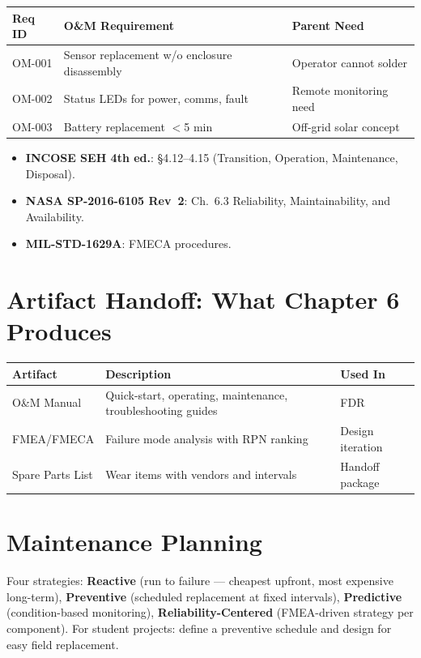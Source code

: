 \documentclass[11pt,letterpaper,twoside,openany]{book}
\begin{document}
\begin{greenshieldbox}
\small
\begin{tabularx}{\textwidth}{l X l}
\toprule
\textbf{Req ID} & \textbf{O\&M Requirement} & \textbf{Parent Need} \\
\midrule
OM-001 & Sensor replacement w/o enclosure disassembly & Operator cannot solder \\
OM-002 & Status LEDs for power, comms, fault & Remote monitoring need \\
OM-003 & Battery replacement $<$5 min & Off-grid solar concept \\
\bottomrule
\end{tabularx}
\end{greenshieldbox}

\begin{keyconceptbox}
\begin{itemize}[nosep,leftmargin=1.5em]
\item \textbf{INCOSE SEH 4th ed.}: \S4.12--4.15 (Transition, Operation, Maintenance, Disposal).
\item \textbf{NASA SP-2016-6105 Rev~2}: Ch.~6.3 Reliability, Maintainability, and Availability.
\item \textbf{MIL-STD-1629A}: FMECA procedures.
\end{itemize}
\end{keyconceptbox}

\section{Artifact Handoff: What Chapter 6 Produces}
\begin{table}[htbp]\centering\small
\begin{tabularx}{\textwidth}{l X l}
\toprule
\textbf{Artifact} & \textbf{Description} & \textbf{Used In} \\
\midrule
O\&M Manual & Quick-start, operating, maintenance, troubleshooting guides & FDR \\
FMEA/FMECA & Failure mode analysis with RPN ranking & Design iteration \\
Spare Parts List & Wear items with vendors and intervals & Handoff package \\
\bottomrule
\end{tabularx}
\end{table}

\section{Maintenance Planning}
Four strategies: \textbf{Reactive} (run to failure — cheapest upfront, most expensive long-term), \textbf{Preventive} (scheduled replacement at fixed intervals), \textbf{Predictive} (condition-based monitoring), \textbf{Reliability-Centered} (FMEA-driven strategy per component). For student projects: define a preventive schedule and design for easy field replacement.
\end{document}
